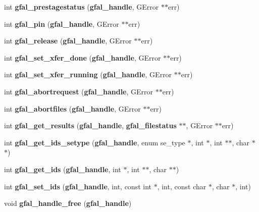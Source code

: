 \begin{DoxyCompactItemize}
\item 
int {\bfseries gfal\_\-prestagestatus} ({\bf gfal\_\-handle}, GError $\ast$$\ast$err)\label{group__srm__group_gabf1d72bcc264ef8a46db472932cc97be}

\item 
int {\bfseries gfal\_\-pin} ({\bf gfal\_\-handle}, GError $\ast$$\ast$err)\label{group__srm__group_ga805822514cecfe9a5a67404ef8d0eedb}

\item 
int {\bfseries gfal\_\-release} ({\bf gfal\_\-handle}, GError $\ast$$\ast$err)\label{group__srm__group_ga61140bef96a8b9a50ea4b57fe686607c}

\item 
int {\bfseries gfal\_\-set\_\-xfer\_\-done} ({\bf gfal\_\-handle}, GError $\ast$$\ast$err)\label{group__srm__group_ga0553923e88bd01125bcfec76363c04e5}

\item 
int {\bfseries gfal\_\-set\_\-xfer\_\-running} ({\bf gfal\_\-handle}, GError $\ast$$\ast$err)\label{group__srm__group_ga0b642dba1a1aae645a14cbade35c1f2c}

\item 
int {\bfseries gfal\_\-abortrequest} ({\bf gfal\_\-handle}, GError $\ast$$\ast$err)\label{group__srm__group_ga2300184f9c84686d1531cb5f5d29e49e}

\item 
int {\bfseries gfal\_\-abortfiles} ({\bf gfal\_\-handle}, GError $\ast$$\ast$err)\label{group__srm__group_ga57f0f00afc925a4703b92d5b3237a157}

\item 
int {\bfseries gfal\_\-get\_\-results} ({\bf gfal\_\-handle}, {\bf gfal\_\-filestatus} $\ast$$\ast$, GError $\ast$$\ast$err)\label{group__srm__group_ga08fd4e225881151d1a824274a1b88357}

\item 
int {\bfseries gfal\_\-get\_\-ids\_\-setype} ({\bf gfal\_\-handle}, enum se\_\-type $\ast$, int $\ast$, int $\ast$$\ast$, char $\ast$$\ast$)\label{group__srm__group_gaa235192b9803b01ab61307d34d6ed31d}

\item 
int {\bfseries gfal\_\-get\_\-ids} ({\bf gfal\_\-handle}, int $\ast$, int $\ast$$\ast$, char $\ast$$\ast$)\label{group__srm__group_ga3006e6505a8342831c9ff0c31ce0d020}

\item 
int {\bfseries gfal\_\-set\_\-ids} ({\bf gfal\_\-handle}, int, const int $\ast$, int, const char $\ast$, char $\ast$, int)\label{group__srm__group_gad5f3894b14e9b5ce190cb820f0cce073}

\item 
void {\bfseries gfal\_\-handle\_\-free} ({\bf gfal\_\-handle})\label{group__srm__group_gaeea4474e516ec8ce195b0966507b9d54}

\end{DoxyCompactItemize}
